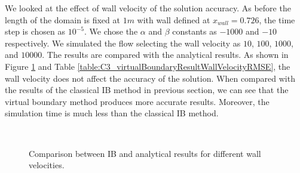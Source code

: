 We looked at the effect of wall velocity of the solution accuracy. As before the length of the domain is fixed at $1 m$ with wall defined at $x_{wall} = 0.726$, the time step is chosen as $10^{-5}$. We chose the $\alpha$ and $\beta$ constants as $-1000$ and $-10$ respectively. We simulated the flow selecting the wall velocity as $10$, $100$, $1000$, and $10000$. The results are compared with the analytical results. As shown in Figure \ref{fig:C3_virtualBoundaryResultWallVelocity} and Table \ref{table:C3_virtualBoundaryResultWallVelocityRMSE}, the wall velocity does not affect the accuracy of the solution. When compared with the results of the classical IB method in previous section, we can see that the virtual boundary method produces more accurate results. Moreover, the simulation time is much less than the classical IB method.

\begin{figure}[H]
	\centering
	\quad
	\\
	\quad
	\caption{Comparison between IB and analytical results for different wall velocities.}
	\label{fig:C3_virtualBoundaryResultWallVelocity}
\end{figure}

